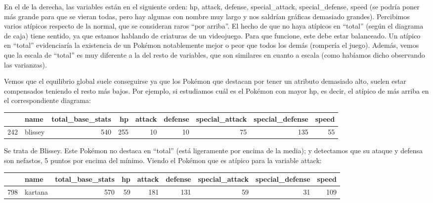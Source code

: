 \documentclass[
  11.8pt,
]{extreport}
\begin{document}
En el de la derecha, las variables están en el siguiente orden: hp,
attack, defense, special\_attack, special\_defense, speed (se podría
poner más grande para que se vieran todas, pero hay algunas con nombre
muy largo y nos saldrían gráficas demasiado grandes). Percibimos varios
atípicos respecto de la normal, que se consideran raros ``por arriba''.
El hecho de que no haya atípicos en ``total'' (según el diagrama de
caja) tiene sentido, ya que estamos hablando de criaturas de un
videojuego. Para que funcione, este debe estar balanceado. Un atípico en
``total'' evidenciaría la existencia de un Pokémon notablemente mejor o
peor que todos los demás (rompería el juego). Además, vemos que la
escala de ``total'' es muy diferente a la del resto de variables, que
son similares en cuanto a escala (como habíamos dicho observando las
varianzas).

Vemos que el equilibrio global suele conseguirse ya que los Pokémon que
destacan por tener un atributo demasiado alto, suelen estar compensados
teniendo el resto más bajos. Por ejemplo, si estudiamos cuál es el
Pokémon con mayor hp, es decir, el atípico de más arriba en el
correspondiente diagrama:

\begin{table}[H]
\centering\begingroup\fontsize{9.5}{11.5}\selectfont

\begin{tabular}{llrrrrrrr}
\toprule
  & name & total\_base\_stats & hp & attack & defense & special\_attack & special\_defense & speed\\
\midrule
242 & blissey & 540 & 255 & 10 & 10 & 75 & 135 & 55\\
\bottomrule
\end{tabular}
\endgroup{}
\end{table}

Se trata de Blissey. Este Pokémon no destaca en ``total'' (está
ligeramente por encima de la media); y detectamos que su ataque y
defensa son nefastos, 5 puntos por encima del mínimo. Viendo el Pokémon
que es atípico para la variable attack:

\begin{table}[H]
\centering\begingroup\fontsize{9.5}{11.5}\selectfont

\begin{tabular}{llrrrrrrr}
\toprule
  & name & total\_base\_stats & hp & attack & defense & special\_attack & special\_defense & speed\\
\midrule
798 & kartana & 570 & 59 & 181 & 131 & 59 & 31 & 109\\
\bottomrule
\end{tabular}
\endgroup{}
\end{table}
\end{document}
